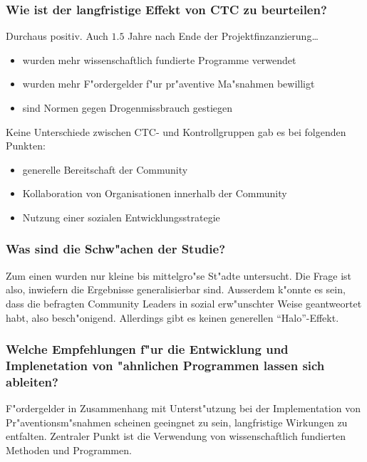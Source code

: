\subsubsection{Wie ist der langfristige Effekt von CTC zu beurteilen?}
Durchaus positiv. Auch $1.5$ Jahre nach Ende der Projektfinzanzierung\ldots
\begin{itemize}
        \item wurden mehr wissenschaftlich fundierte Programme verwendet
        \item wurden mehr F"ordergelder f"ur pr"aventive Ma"snahmen bewilligt
        \item sind Normen gegen Drogenmissbrauch gestiegen
\end{itemize}

\noindent Keine Unterschiede zwischen CTC- und Kontrollgruppen gab es bei folgenden Punkten:
\begin{itemize}
        \item generelle Bereitschaft der Community
        \item Kollaboration von Organisationen innerhalb der Community
        \item Nutzung einer sozialen Entwicklungsstrategie
\end{itemize}

\subsubsection{Was sind die Schw"achen der Studie?}
Zum einen wurden nur kleine bis mittelgro"se St"adte untersucht. Die Frage ist also, inwiefern die Ergebnisse generalisierbar sind. Ausserdem k"onnte es sein, dass die befragten Community Leaders in sozial erw"unschter Weise geantweortet habt, also besch"onigend. Allerdings gibt es keinen generellen ``Halo''-Effekt.

\subsubsection{Welche Empfehlungen f"ur die Entwicklung und Implenetation von "ahnlichen Programmen lassen sich ableiten?}
F"ordergelder in Zusammenhang mit Unterst"utzung bei der Implementation von Pr"aventionsm"snahmen scheinen geeingnet zu sein, langfristige Wirkungen zu entfalten. Zentraler Punkt ist die Verwendung von wissenschaftlich fundierten Methoden und Programmen.
